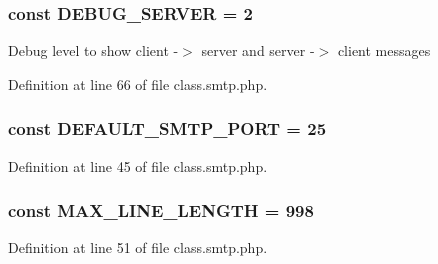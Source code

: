 \subsubsection[{\texorpdfstring{D\+E\+B\+U\+G\+\_\+\+S\+E\+R\+V\+ER}{DEBUG_SERVER}}]{\setlength{\rightskip}{0pt plus 5cm}const D\+E\+B\+U\+G\+\_\+\+S\+E\+R\+V\+ER = 2}\hypertarget{class_s_m_t_p_a72dc4712d174a8bfd77415d88a9a2fb3}{}\label{class_s_m_t_p_a72dc4712d174a8bfd77415d88a9a2fb3}
Debug level to show client -\/$>$ server and server -\/$>$ client messages 

Definition at line 66 of file class.\+smtp.\+php.

\subsubsection[{\texorpdfstring{D\+E\+F\+A\+U\+L\+T\+\_\+\+S\+M\+T\+P\+\_\+\+P\+O\+RT}{DEFAULT_SMTP_PORT}}]{\setlength{\rightskip}{0pt plus 5cm}const D\+E\+F\+A\+U\+L\+T\+\_\+\+S\+M\+T\+P\+\_\+\+P\+O\+RT = 25}\hypertarget{class_s_m_t_p_a71f9f123c4ea8e8f470e46b58a4e527f}{}\label{class_s_m_t_p_a71f9f123c4ea8e8f470e46b58a4e527f}


Definition at line 45 of file class.\+smtp.\+php.

\subsubsection[{\texorpdfstring{M\+A\+X\+\_\+\+L\+I\+N\+E\+\_\+\+L\+E\+N\+G\+TH}{MAX_LINE_LENGTH}}]{\setlength{\rightskip}{0pt plus 5cm}const M\+A\+X\+\_\+\+L\+I\+N\+E\+\_\+\+L\+E\+N\+G\+TH = 998}\hypertarget{class_s_m_t_p_a466169b7248c947b2d0d468a955573e7}{}\label{class_s_m_t_p_a466169b7248c947b2d0d468a955573e7}


Definition at line 51 of file class.\+smtp.\+php.

